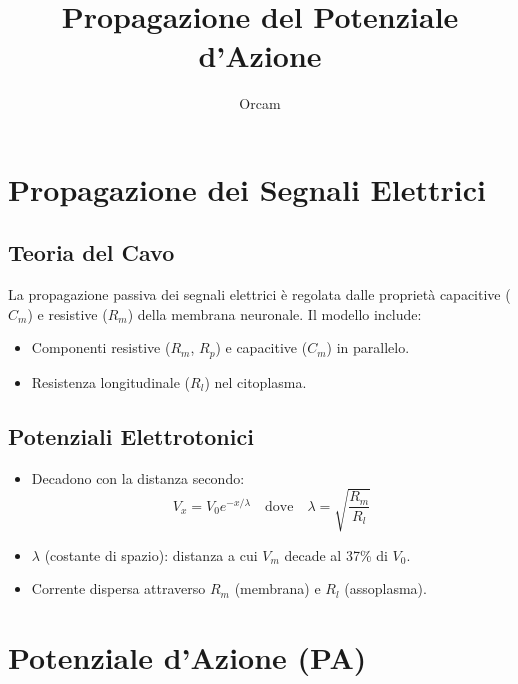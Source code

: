 \documentclass{article}
\title{Propagazione del Potenziale d'Azione}
\author{Orcam}
\date{}
\begin{document}
\maketitle

\section{Propagazione dei Segnali Elettrici}
\subsection{Teoria del Cavo}
La propagazione passiva dei segnali elettrici è regolata dalle proprietà capacitive (\(C_m\)) e resistive (\(R_m\)) della membrana neuronale. Il modello include:
\begin{itemize}
    \item Componenti resistive (\(R_{m}\), \(R_p\)) e capacitive (\(C_m\)) in parallelo.
    \item Resistenza longitudinale (\(R_l\)) nel citoplasma.
\end{itemize}


\subsection{Potenziali Elettrotonici}
\begin{itemize}
    \item Decadono con la distanza secondo: 
    \[
    V_x = V_0 e^{-x/\lambda} \quad \text{dove} \quad \lambda = \sqrt{\frac{R_m}{R_l}}
    \]
    \item \(\lambda\) (costante di spazio): distanza a cui \(V_m\) decade al 37\% di \(V_0\).
    \item Corrente dispersa attraverso \(R_m\) (membrana) e \(R_l\) (assoplasma).
\end{itemize}


\section{Potenziale d'Azione (PA)}
\end{document}
